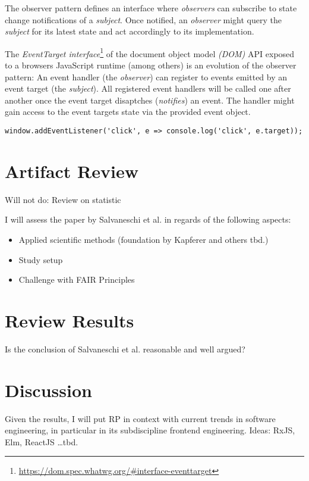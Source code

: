 \documentclass[11pt,a4paper,twocolumn]{article}
\begin{document}
	The observer pattern \cite{gamma1995design} defines an interface where \emph{observers} can subscribe to state change notifications of a \emph{subject}. Once notified, an \emph{observer} might query the \emph{subject} for its latest state and act accordingly to its implementation.

	The \emph{EventTarget interface}\footnote{\url{https://dom.spec.whatwg.org/\#interface-eventtarget}} of the document object model \emph{(DOM)} API exposed to a browsers JavaScript runtime (among others) is an evolution of the observer pattern: An event handler (the \emph{observer}) can register to events emitted by an event target (the \emph{subject}). All registered event handlers will be called one after another once the event target disaptches (\emph{notifies}) an event. The handler might gain access to the event targets state via the provided event object.


	\begin{verbatim}
window.addEventListener('click', e => console.log('click', e.target));
	\end{verbatim}

	\section{Artifact Review}
	Will not do: Review on statistic

	I will assess the paper by Salvaneschi et al. \cite{7827078} in regards of the following aspects:
	\begin{itemize}
		\item Applied scientific methods (foundation by Kapferer \cite{kapferer:2019:empirical} and others tbd.)
		\item Study setup
		\item Challenge with FAIR Principles \cite{2019arXiv190805986H} \cite{wilkinson:2016}
	\end{itemize}



	\section{Review Results}
	Is the conclusion of Salvaneschi et al. \cite{7827078} reasonable and well argued?



	\section{Discussion}
	Given the results, I will put RP in context with current trends in software engineering, in particular in its subdiscipline frontend engineering.
	Ideas: RxJS, Elm, ReactJS \dots tbd.
\end{document}

